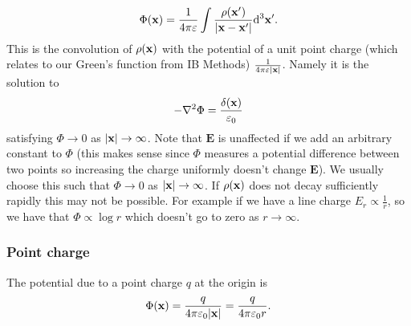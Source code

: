 \documentclass{article}
\begin{document}
\[
	\Phi(\mathbf{x})=\frac1{4\pi\varepsilon}\int\frac{\rho(\mathbf{x}')}{|\mathbf{x}-\mathbf{x}'|}\mathrm d^3\mathbf{x}'.
\]
This is the convolution of $ \rho(\mathbf{x}) $ with the potential of a unit point charge (which relates to our Green's function from IB Methods) $ \frac{1}{4\pi\varepsilon |\mathbf{x}|}$. Namely it is the solution to
\[
	-\nabla^2\Phi = \frac{\delta(\mathbf{x})}{\varepsilon_0}
\]
satisfying $ \Phi\to 0 $ as $ |\mathbf{x}|\to \infty $. Note that $ \mathbf E $ is unaffected if we add an arbitrary constant to $ \Phi $ (this makes sense since $ \Phi $ measures a potential difference between two points so increasing the charge uniformly doesn't change $ \mathbf E $). We usually choose this such that $ \Phi \to 0 $ as $ |\mathbf{x}|\to \infty $. If $ \rho(\mathbf{x}) $ does not decay sufficiently rapidly this may not be possible. For example if we have a line charge $ E_r\propto \frac 1r $, so we have that $ \Phi\propto \log r $ which doesn't go to zero as $ r\to \infty $.
\subsubsection{Point charge}
The potential due to a point charge $ q $ at the origin is
\[
	\Phi(\mathbf{x}) = \frac q{4\pi\varepsilon_0|\mathbf{x}|} = \frac q{4\pi\varepsilon_0 r}.
\]
\end{document}
